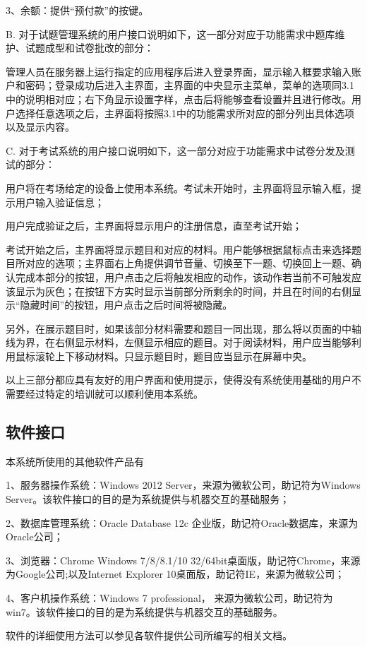 3、余额：提供“预付款”的按键。

B. 对于试题管理系统的用户接口说明如下，这一部分对应于功能需求中题库维护、试题成型和试卷批改的部分：

管理人员在服务器上运行指定的应用程序后进入登录界面，显示输入框要求输入账户和密码；登录成功后进入主界面，主界面的中央显示主菜单，菜单的选项同3.1中的说明相对应；右下角显示设置字样，点击后将能够查看设置并且进行修改。用户选择任意选项之后，主界面将按照3.1中的功能需求所对应的部分列出具体选项以及显示内容。

C. 对于考试系统的用户接口说明如下，这一部分对应于功能需求中试卷分发及测试的部分：

用户将在考场给定的设备上使用本系统。考试未开始时，主界面将显示输入框，提示用户输入验证信息；

用户完成验证之后，主界面将显示用户的注册信息，直至考试开始；

考试开始之后，主界面将显示题目和对应的材料。用户能够根据鼠标点击来选择题目所对应的选项；主界面右上角提供调节音量、切换至下一题、切换回上一题、确认完成本部分的按钮，用户点击之后将触发相应的动作，该动作若当前不可触发应该显示为灰色；在按钮下方实时显示当前部分所剩余的时间，并且在时间的右侧显示“隐藏时间”的按钮，用户点击之后时间将被隐藏。

另外，在展示题目时，如果该部分材料需要和题目一同出现，那么将以页面的中轴线为界，在右侧显示材料，左侧显示相应的题目。对于阅读材料，用户应当能够利用鼠标滚轮上下移动材料。只显示题目时，题目应当显示在屏幕中央。

以上三部分都应具有友好的用户界面和使用提示，使得没有系统使用基础的用户不需要经过特定的培训就可以顺利使用本系统。

\subsection{软件接口}
本系统所使用的其他软件产品有

1、服务器操作系统：Windows 2012 Server，来源为微软公司，助记符为Windows Server。该软件接口的目的是为系统提供与机器交互的基础服务；

2、数据库管理系统：Oracle Database 12c 企业版，助记符Oracle数据库，来源为Oracle公司；

3、浏览器：Chrome Windows 7/8/8.1/10 32/64bit桌面版，助记符Chrome，来源为Google公司;以及Internet Explorer 10桌面版，助记符IE，来源为微软公司；

4、客户机操作系统：Windows 7 professional， 来源为微软公司，助记符为win7。该软件接口的目的是为系统提供与机器交互的基础服务。

软件的详细使用方法可以参见各软件提供公司所编写的相关文档。


